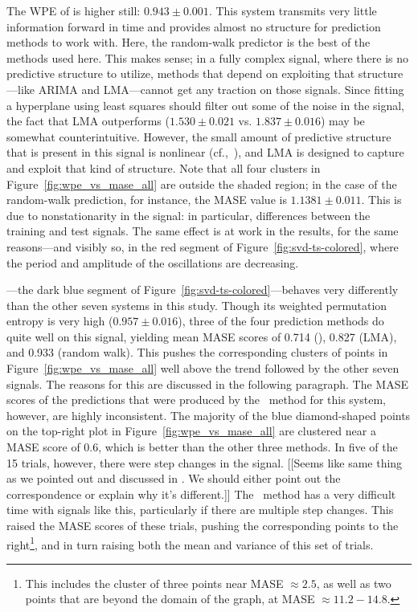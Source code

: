 The WPE of \gcc is higher still: $0.943 \pm 0.001$.  This system
transmits very little information forward in time and provides almost
no structure for prediction methods to work with.  Here, the
random-walk predictor is the best of the methods used here.  This
makes sense; in a fully complex signal, where there is no predictive
structure to utilize, methods that depend on exploiting that
structure---like ARIMA and LMA---cannot get any traction on those
signals.
%
%
Since fitting a hyperplane using least squares should filter out some
of the noise in the signal, the fact that LMA outperforms \arima
($1.530 \pm 0.021$ vs. $1.837 \pm 0.016$) may be somewhat
counterintuitive.  However, the small amount of predictive structure
that is present in this signal is nonlinear (cf.,~\cite{mytkowicz09}),
and LMA is designed to capture and exploit that kind of structure.
Note that all four \gcc clusters in Figure~\ref{fig:wpe_vs_mase_all}
are outside the shaded region; in the case of the random-walk
prediction, for instance, the MASE value is $1.1381 \pm 0.011$.  This
is due to nonstationarity in the signal: in particular, differences
between the training and test signals.  The same effect is at work in
the \svdtwo results, for the same reasons---and visibly so, in the red
segment of Figure~\ref{fig:svd-ts-colored}, where the period and
amplitude of the oscillations are decreasing.

\svdone---the dark blue segment of
Figure~\ref{fig:svd-ts-colored}---behaves very differently than the
other seven systems in this study.  Though its weighted permutation
entropy is very high ($0.957 \pm 0.016$), three of the four prediction
methods do quite well on this signal, yielding mean MASE scores of
0.714 (\arima), 0.827 (LMA), and 0.933 (random walk).  This pushes the
corresponding clusters of points in Figure~\ref{fig:wpe_vs_mase_all}
well above the trend followed by the other seven signals.  The reasons
for this are discussed in the following paragraph.  The MASE scores of
the predictions that were produced by the \naive ~method for this
system, however, are highly inconsistent.  The majority of the blue
diamond-shaped points on the top-right plot in
Figure~\ref{fig:wpe_vs_mase_all} are clustered near a MASE score of
0.6, which is better than the other three methods.  In five of the 15
\svdone trials, however, there were step changes in the signal.
\alert{[[Seems like same thing as we pointed out and discussed in
      \col.  We should either point out the correspondence or explain
      why it's different.]]}  The \naive ~method has a very difficult
time with signals like this, particularly if there are multiple step
changes.  This raised the MASE scores of these trials, pushing the
corresponding points to the right\footnote{This includes the cluster
  of three points near MASE $\approx 2.5$, as well as two points that
  are beyond the domain of the graph, at MASE $\approx 11.2-14.8$.},
and in turn raising both the mean and variance of this set of trials.

